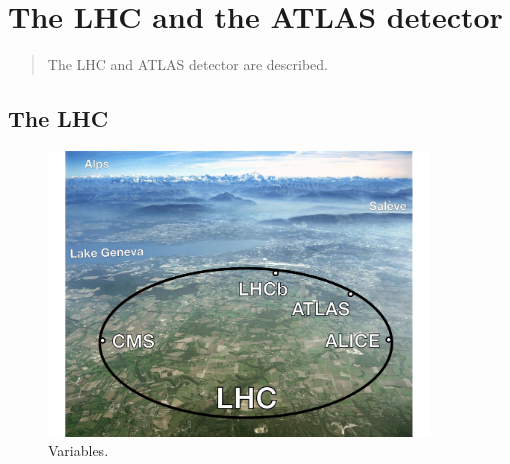 \chapter[The LHC and the ATLAS detector][The LHC and the ATLAS detector]{The LHC and the ATLAS detector}
\label{chap:lhcatlas}

\begin{quote}
  The LHC and ATLAS detector are described.
\end{quote}
 
\section{The LHC}
\label{sec:lhc}

\begin{figure}[tp]
  \centering
  \includegraphics[width=0.90\textwidth]{figures/lhc-atlas/lhc-switzerland}
  \caption{Variables.}
  \label{fig:lhc-switzerland}
\end{figure}

